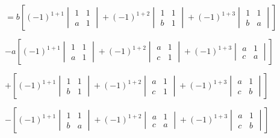 \documentclass[fleqn]{article}
\begin{document}
\begin{enumerate}
      \textcolor{hwColor}{
        $=b\left[(-1)^{1+1}
        \begin{vmatrix}
          1 & 1 \\
          a & 1
        \end{vmatrix}
        +(-1)^{1+2}
        \begin{vmatrix}
          1 & 1 \\
          b & 1
        \end{vmatrix}
        +(-1)^{1+3}
        \begin{vmatrix}
          1 & 1 \\
          b & a 
        \end{vmatrix}
        \right]
        $
      }

      \textcolor{hwColor}{
        $-a\left[(-1)^{1+1}
        \begin{vmatrix}
          1 & 1 \\
          a & 1
        \end{vmatrix}
        +(-1)^{1+2}
        \begin{vmatrix}
          a & 1 \\
          c & 1
        \end{vmatrix}
        +(-1)^{1+3}
        \begin{vmatrix}
          a & 1 \\
          c & a
        \end{vmatrix}
        \right]
        $
      }

      \textcolor{hwColor}{
        $
        +\left[(-1)^{1+1}
        \begin{vmatrix}
          1 & 1 \\
          b & 1
        \end{vmatrix}
        +(-1)^{1+2}
        \begin{vmatrix}
          a & 1 \\
          c & 1
        \end{vmatrix}
        +(-1)^{1+3}
        \begin{vmatrix}
          a & 1 \\
          c & b
        \end{vmatrix}
        \right]
        $
      }

      \textcolor{hwColor}{
        $-\left[(-1)^{1+1}
        \begin{vmatrix}
          1 & 1 \\
          b & a
        \end{vmatrix}
        +(-1)^{1+2}
        \begin{vmatrix}
          a & 1 \\
          c & a 
        \end{vmatrix}
        +(-1)^{1+3}
        \begin{vmatrix}
          a & 1 \\
          c & b
        \end{vmatrix}
        \right]
        $
      }


\end{enumerate}
\end{document}
